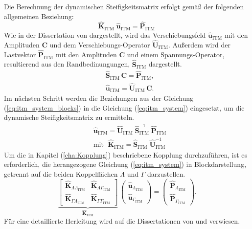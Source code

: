 Die Berechnung der dynamischen Steifigkeitsmatrix erfolgt gemäß der folgenden allgemeinen Beziehung:
\begin{equation}\label{eq:itm_system}
	\hat{\mathbf K}_{\mathrm{ITM}}\;\hat{\mathbf u}_{\mathrm{ITM}}
	= \hat{\mathbf P}_{\mathrm{ITM}}\,
\end{equation}
Wie in der Dissertation von \cite{Hackenberg2016} dargestellt, wird das Verschiebungsfeld $\hat{\mathbf u}_{\mathrm{ITM}}$ mit den Amplituden $\mathbf C$ und dem Verschiebungs-Operator $\hat{\mathbf U}_{\mathrm{ITM}}$. 
Außerdem wird der Lastvektor $\hat{\mathbf P}_{\mathrm{ITM}}$ mit den Amplituden $\mathbf C$ und einem Spannungs-Operator, resultierend aus den Randbedinungungen, $\hat{\mathbf S}_{\mathrm{ITM}}$ dargestellt.
\begin{subequations}\label{eq:itm_system_blocks}
	\begin{align}
		&\hat{\mathbf S}_{\mathrm{ITM}}\,\mathbf C = \hat{\mathbf P}_{\mathrm{ITM}}, \label{eq:itm_system_blocks_a}\\
		&\hat{\mathbf u}_{\mathrm{ITM}} = \hat{\mathbf U}_{\mathrm{ITM}}\,\mathbf C. \label{eq:itm_system_blocks_b}
	\end{align}
\end{subequations}
Im nächsten Schritt werden die Beziehungen aus der Gleichung (\ref{eq:itm_system_blocks}) in die Gleichung (\ref{eq:itm_system}) eingesetzt, um die dynamische Steifigkeitsmatrix zu ermitteln.
\begin{subequations}\label{eq:itm_subeqs}
	\begin{align}
		&\hat{\mathbf u}_{\mathrm{ITM}}
		= \hat{\mathbf U}_{\mathrm{ITM}}\;\hat{\mathbf S}_{\mathrm{ITM}}^{-1}\;\hat{\mathbf P}_{\mathrm{ITM}}
		\label{eq:itm_subeqs_u}\\
		&\text{mit }\;\hat{\mathbf K}_{\mathrm{ITM}}
		= \hat{\mathbf S}_{\mathrm{ITM}}\;\hat{\mathbf U}_{\mathrm{ITM}}^{-1}
		\label{eq:itm_subeqs_K}
	\end{align}
\end{subequations}
Um die in Kapitel (\ref{cha:Kopplung}) beschriebene Kopplung durchzuführen, ist es erforderlich, die herangezogene Gleichung (\ref{eq:itm_system}) in Blockdarstellung, getrennt auf die beiden Koppelflächen $\Lambda$ und $\Gamma$ darzustellen.
\begin{equation}\label{eq:itm_block_system_braced}
	\underbrace{\begin{bmatrix}
			\hat{\mathbf K}_{\Lambda\Lambda_{\mathrm{ITM}}} &
			\hat{\mathbf K}_{\Lambda\Gamma_{\mathrm{ITM}}} \\
			\hat{\mathbf K}_{\Gamma\Lambda_{\mathrm{ITM}}} &
			\hat{\mathbf K}_{\Gamma\Gamma_{\mathrm{ITM}}}
	\end{bmatrix}}_{\hat{\mathbf K}_{\mathrm{ITM}}}\,
	\begin{pmatrix}
		\hat{\mathbf u}_{\Lambda_{\mathrm{ITM}}} \\
		\hat{\mathbf u}_{\Gamma_{\mathrm{ITM}}}
	\end{pmatrix}
	=
	\begin{pmatrix}
		\hat{\mathbf P}_{\Lambda_{\mathrm{ITM}}} \\
		\hat{\mathbf P}_{\Gamma_{\mathrm{ITM}}}
	\end{pmatrix}.
\end{equation}
Für eine detaillierte Herleitung wird auf die Dissertationen von \cite{Hackenberg2016} und \cite{Freisinger2022} verwiesen.